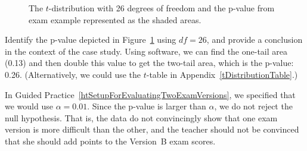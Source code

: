 \begin{figure}[h]
  \centering
  \caption{The $t$-distribution with 26 degrees of freedom
      and the p-value from exam example represented
      as the shaded areas.}
  \label{pValueOfTwoTailAreaOfExamVersionsWhereDFIs26}
\end{figure}

\begin{examplewrap}
\begin{nexample}{Identify the p-value depicted in
    Figure~\ref{pValueOfTwoTailAreaOfExamVersionsWhereDFIs26}
    using $df = 26$, and provide a conclusion in the
    context of the case study.}
  Using software, we can find the one-tail area (0.13)
  and then double this value to get the two-tail area,
  which is the p-value: 0.26.
  (Alternatively, we could use the $t$-table in
  Appendix~\ref{tDistributionTable}.)

  In Guided
  Practice~\ref{htSetupForEvaluatingTwoExamVersions},
  we specified that we would use $\alpha = 0.01$.
  Since the p-value is larger than $\alpha$,
  we do not reject the null hypothesis.
  That is, the data do not convincingly show that one exam
  version is more difficult than the other, and the teacher
  should not be convinced that she should add points to the
  Version~B exam scores.
\end{nexample}
\end{examplewrap}


